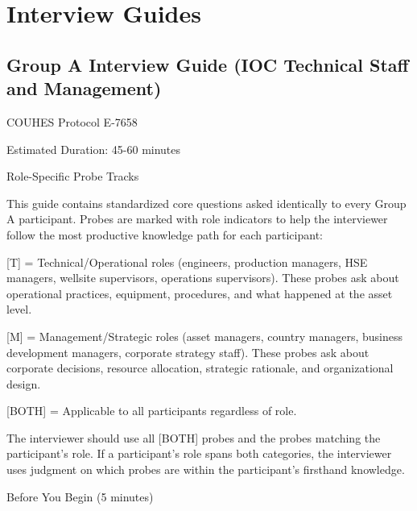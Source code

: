 \hypertarget{interview-guides}{%
\chapter{Interview Guides}\label{interview-guides}}

\hypertarget{group-a-interview-guide-ioc-technical-staff-and-management}{%
\section{Group A Interview Guide (IOC Technical Staff and
Management)}\label{group-a-interview-guide-ioc-technical-staff-and-management}}

COUHES Protocol E-7658

Estimated Duration: 45-60 minutes

Role-Specific Probe Tracks

This guide contains standardized core questions asked identically to
every Group A participant. Probes are marked with role indicators to
help the interviewer follow the most productive knowledge path for each
participant:

{[}T{]} = Technical/Operational roles (engineers, production managers,
HSE managers, wellsite supervisors, operations supervisors). These
probes ask about operational practices, equipment, procedures, and what
happened at the asset level.

{[}M{]} = Management/Strategic roles (asset managers, country managers,
business development managers, corporate strategy staff). These probes
ask about corporate decisions, resource allocation, strategic rationale,
and organizational design.

{[}BOTH{]} = Applicable to all participants regardless of role.

The interviewer should use all {[}BOTH{]} probes and the probes matching
the participant's role. If a participant's role spans both categories,
the interviewer uses judgment on which probes are within the
participant's firsthand knowledge.

Before You Begin (5 minutes)


